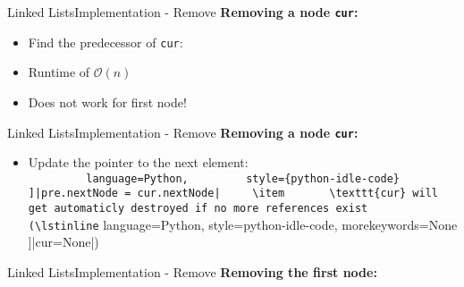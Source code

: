 
\begin{frame}{Linked Lists}{Implementation - Remove}
  \textbf{Removing a node \texttt{cur}:}
  \begin{itemize}
    \item
      Find the predecessor of \texttt{cur}:\\
      
    \item
      Runtime of $\mathcal{O}(n)$
    \item
      Does not work for first node!
  \end{itemize}
  \vspace{-1.5em}
  \begin{flushleft}
    
  \end{flushleft}
\end{frame}


\begin{frame}{Linked Lists}{Implementation - Remove}
  \textbf{Removing a node \texttt{cur}:}
  \begin{itemize}
    \item
      Update the pointer to the next element:\\
      \lstinline[
        language=Python,
        style={python-idle-code}
      ]|pre.nextNode = cur.nextNode|
    \item
      \texttt{cur} will get automaticly destroyed if no more references exist
      (\lstinline[
        language=Python,
        style={python-idle-code},
        morekeywords={None}
      ]|cur=None|)
  \end{itemize}
  \begin{flushleft}
    
  \end{flushleft}
\end{frame}


\begin{frame}{Linked Lists}{Implementation - Remove}
  \textbf{Removing the first node:}
  \begin{flushleft}
    
  \end{flushleft}
\end{frame}

